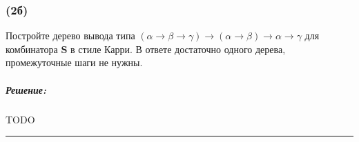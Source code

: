 \documentclass{article}
\newenvironment{proof}{\subparagraph{\hspace{-1em}Решение:\newline}}{\par\noindent\rule{\textwidth}{0.4pt}}
\newcommand{\term}[1]{\mathbf{#1}}
\begin{document}
    \subsubsection{(2б)}

    Постройте дерево вывода типа $(\alpha \to \beta \to \gamma) \to (\alpha \to \beta) \to \alpha \to \gamma$ для комбинатора $\term{S}$ в стиле Карри.
    В ответе достаточно одного дерева, промежуточные шаги не нужны.

    \begin{proof}
        TODO %
    \end{proof}
\end{document}
